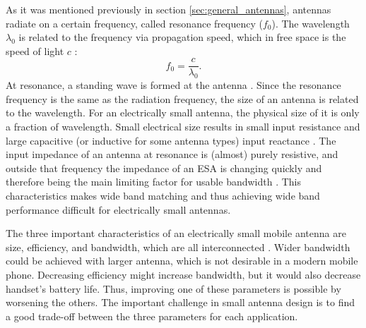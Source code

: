 As it was mentioned previously in section \ref{sec:general_antennas}, antennas radiate on a certain frequency, called resonance frequency ($f_0$). The wavelength $\lambda_0$ is related to the frequency via propagation speed, which in free space is the speed of light $c$ \cite{stutzman}:
\begin{equation}
\label{eq:fcl}
    f_0 = \frac{c}{\lambda_0}.
\end{equation}
At resonance, a standing wave is formed at the antenna \cite{stutzman}. Since the resonance frequency is the same as the radiation frequency, the size of an antenna is related to the wavelength. For an electrically small antenna, the physical size of it is only a fraction of wavelength. Small electrical size results in small input resistance and large capacitive (or inductive for some antenna types) input reactance \cite{modern_small_antennas}. The input impedance of an antenna at resonance is (almost) purely resistive, and outside that frequency the impedance of an ESA is changing quickly and therefore being the main limiting factor for usable bandwidth \cite{holopainen_phd}. This characteristics makes wide band matching and thus achieving wide band performance difficult for electrically small antennas.

The three important characteristics of an electrically small mobile antenna are size, efficiency, and bandwidth, which are all interconnected \cite{holopainen_phd}. Wider bandwidth could be achieved with larger antenna, which is not desirable in a modern mobile phone. Decreasing efficiency might increase bandwidth, but it would also decrease handset's battery life. Thus, improving one of these parameters is possible by worsening the others. The important challenge in small antenna design is to find a good trade-off between the three parameters for each application.

